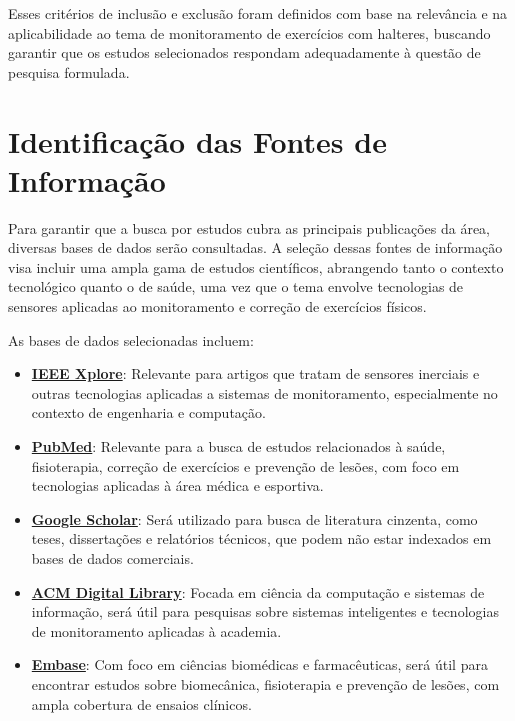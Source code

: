 \documentclass[a4paper,12pt]{article}
\begin{document}
Esses critérios de inclusão e exclusão foram definidos com base na relevância e na aplicabilidade ao tema de monitoramento de exercícios com halteres, buscando garantir que os estudos selecionados respondam adequadamente à questão de pesquisa formulada.

\section{Identificação das Fontes de Informação}
\label{sec:fontes}

Para garantir que a busca por estudos cubra as principais publicações da área, diversas bases de dados serão consultadas. A seleção dessas fontes de informação visa incluir uma ampla gama de estudos científicos, abrangendo tanto o contexto tecnológico quanto o de saúde, uma vez que o tema envolve tecnologias de sensores aplicadas ao monitoramento e correção de exercícios físicos.

As bases de dados selecionadas incluem:

\begin{itemize}
    \item \textbf{\href{https://ieeexplore.ieee.org/search/advanced}{IEEE Xplore}}: Relevante para artigos que tratam de sensores inerciais e outras tecnologias aplicadas a sistemas de monitoramento, especialmente no contexto de engenharia e computação.
    
    \item \textbf{\href{https://pubmed.ncbi.nlm.nih.gov/advanced/}{PubMed}}: Relevante para a busca de estudos relacionados à saúde, fisioterapia, correção de exercícios e prevenção de lesões, com foco em tecnologias aplicadas à área médica e esportiva.
    
    \item \textbf{\href{https://scholar.google.com/}{Google Scholar}}: Será utilizado para busca de literatura cinzenta, como teses, dissertações e relatórios técnicos, que podem não estar indexados em bases de dados comerciais.
    
    \item \textbf{\href{https://dl.acm.org/search/advanced}{ACM Digital Library}}: Focada em ciência da computação e sistemas de informação, será útil para pesquisas sobre sistemas inteligentes e tecnologias de monitoramento aplicadas à academia.
    
    \item \textbf{\href{https://www.embase.com/landing?status=yellow}{Embase}}: Com foco em ciências biomédicas e farmacêuticas, será útil para encontrar estudos sobre biomecânica, fisioterapia e prevenção de lesões, com ampla cobertura de ensaios clínicos.

\end{itemize}
\end{document}
